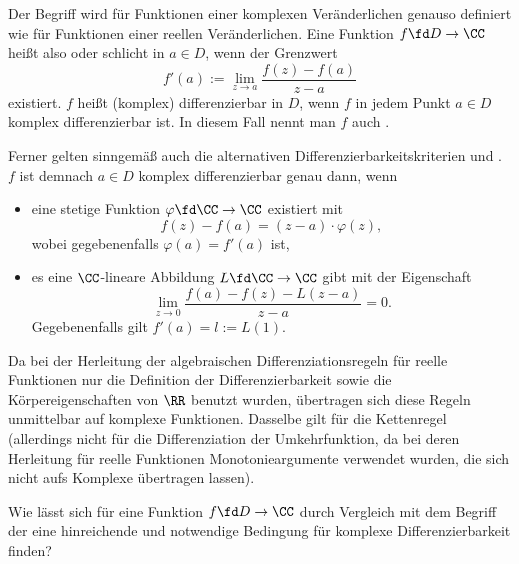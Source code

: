 \begin{antwort}
  Der Begriff wird für Funktionen einer komplexen Veränderlichen 
  genauso definiert wie für Funktionen einer reellen Veränderlichen. 
  Eine Funktion $f\fd D\to \CC$ heißt also  oder schlicht  in $a\in D$, 
  wenn der Grenzwert 
  \[
  f'(a) := \lim_{z\to a } \frac{f(z)-f(a)}{z-a}
  \tag{C1}
  \]
  existiert. $f$ heißt (komplex) differenzierbar in $D$, wenn 
  $f$ in jedem Punkt $a\in D$ komplex differenzierbar ist. In diesem 
  Fall nennt man $f$ auch .  

  Ferner gelten sinngemäß auch die alternativen Differenzierbarkeitskriterien 
   und . $f$ ist demnach $a\in D$ 
  komplex differenzierbar genau dann, 
  wenn 
  {\setlength{\labelsep}{4mm}
    \begin{itemize}
    \item[\desc{i}] eine stetige Funktion $\varphi\fd \CC\to\CC$ existiert mit 
      \[ 
      f(z)-f(a)=(z-a) \cdot \varphi (z), \tag{C3} 
      \]
      wobei gegebenenfalls $\varphi(a)=f'(a)$ ist, \\[-3.5mm]
    \item[\desc{ii}] es eine $\CC$-lineare Abbildung 
      $L \fd \CC\to\CC$ gibt mit der Eigenschaft  
      \[
      \lim_{z\to 0} \frac{f(a)-f(z)-L(z-a)}{z-a} =0. \tag{C2}
      \]
      Gegebenenfalls gilt $f'(a)=l:= L(1)$. 
    \end{itemize}}
  \noindent
  Da bei der Herleitung der algebraischen Differenziationsregeln 
  für reelle Funktionen nur die Definition der Differenzierbarkeit 
  sowie die Körpereigenschaften von $\RR$ benutzt wurden, übertragen sich 
  diese Regeln unmittelbar auf komplexe Funktionen. Dasselbe gilt 
  für die Kettenregel 
  (allerdings nicht für die Differenziation der Umkehrfunktion, da bei deren 
  Herleitung für reelle Funktionen Monotonieargumente verwendet wurden, die 
  sich nicht aufs Komplexe übertragen lassen).  \AntEnd
\end{antwort} 

\begin{frage}\label{10_cauchy_riemann}
  Wie lässt sich für eine Funktion 
  $f\fd D\to\CC$ durch Vergleich mit dem Begriff der 
   eine hinreichende und notwendige 
  Bedingung für komplexe Differenzierbarkeit finden?
\end{frage}

